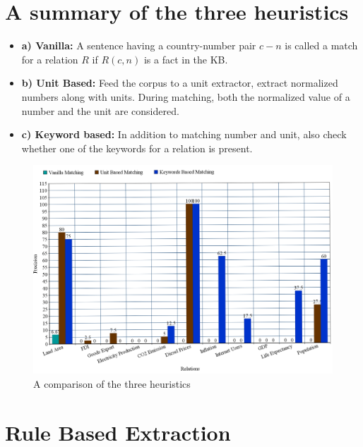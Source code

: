 \documentclass[a4paper,10pt]{article}
\begin{document}
\section{A summary of the three heuristics}

\begin{itemize}
\item \textbf{a) Vanilla:} A sentence having a country-number pair $c-n$ is called a match for a relation $R$ if $R(c,n)$ is a fact in the KB.
\item \textbf{b) Unit Based:} Feed the corpus to a unit extractor, extract normalized numbers along with units. During matching, both the normalized value of a number
and the unit are considered.
\item \textbf{c) Keyword based:} In addition to matching number and unit, also check whether one of the keywords for a relation is present. 
\end{itemize}

\begin{figure}[H]
 \centering
 \includegraphics[bb=0 0 1360 1000,scale=0.25]{./results.png}
 \caption{A comparison of the three heuristics}
 \label{fig:comp}
\end{figure}



\section{Rule Based Extraction}
\end{document}
